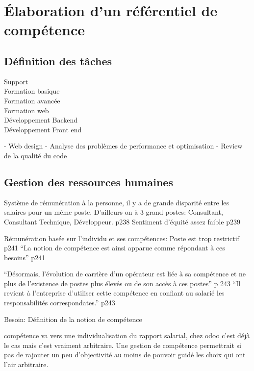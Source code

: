 \chapter{Élaboration d'un référentiel de compétence}
\section{Définition des tâches}

\begin{description}
    \item[Support] 
    \item[Formation basique]
    \item[Formation avancée]
    \item[Formation web]
    \item[Développement Backend]
    \item[Développement Front end]
\end{description}

- Web design
- Analyse des problèmes de performance et optimisation
- Review de la qualité du code









\section{Gestion des ressources humaines} \cite{gestionressourceshumaine2007}

Système de rémunération à la personne, il y a de grande disparité entre les salaires pour un même poste. D'ailleurs on à 3 grand postes: Consultant, Consultant Technique, Développeur. p238
Sentiment d'équité assez faible p239

Rémunération basée sur l'individu et ses compétences: Poste est trop restrictif p241
``La notion de compétence est ainsi apparue comme répondant à ces besoins'' p241

``Désormais, l'évolution de carrière d'un opérateur est liée à sa compétence et ne plus de l'existence de postes plus élevés ou de son accès à ces postes'' p 243
``Il revient à l'entreprise d'utiliser cette compétence en confiant au salarié les responsabilités correspondates.'' p243



Besoin: Définition de la notion de compétence


compétence va vers une individualisation du rapport salarial, chez odoo c'est déjà le cas mais c'est vraiment arbitraire. Une gestion de compétence permettrait si pas de rajouter un peu d'objectivité au moins de pouvoir guidé les choix qui ont l'air arbitraire. 


